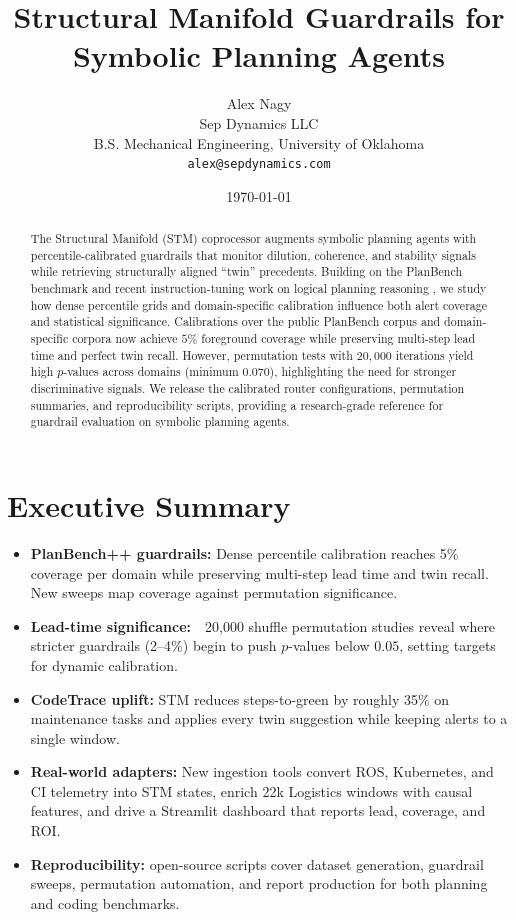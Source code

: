 \documentclass[11pt]{article}
\title{Structural Manifold Guardrails for Symbolic Planning Agents}
\author{Alex Nagy\\Sep Dynamics LLC\\B.S. Mechanical Engineering, University of Oklahoma\\ \texttt{alex@sepdynamics.com}}
\date{\today}
\begin{document}
\maketitle

\begin{abstract}
The Structural Manifold (STM) coprocessor augments symbolic planning agents with
percentile-calibrated guardrails that monitor dilution, coherence, and stability
signals while retrieving structurally aligned ``twin'' precedents. Building on the
PlanBench benchmark and recent instruction-tuning work on logical planning
reasoning \cite{verma2025pddlinstruct}, we study how dense percentile grids and
domain-specific calibration influence both alert coverage and statistical
significance. Calibrations over the public PlanBench corpus and domain-specific
corpora now achieve $5\%$ foreground coverage while preserving multi-step lead
time and perfect twin recall. However, permutation tests with $20{,}000$
iterations yield high $p$-values across domains (minimum $0.070$), highlighting
the need for stronger discriminative signals. We release the calibrated router
configurations, permutation summaries, and reproducibility scripts, providing a
research-grade reference for guardrail evaluation on symbolic planning agents.
\end{abstract}

\tableofcontents
\newpage

\section*{Executive Summary}
\begin{sloppypar}
\begin{itemize}
  \item \textbf{PlanBench++ guardrails:} Dense percentile calibration reaches 5\% coverage per domain while preserving multi-step lead time and twin recall. New sweeps map coverage against permutation significance.
  \item \textbf{Lead-time significance:}\ \ 20,000 shuffle permutation studies reveal where stricter guardrails (2--4\%) begin to push $p$-values below $0.05$, setting targets for dynamic calibration.
  \item \textbf{CodeTrace uplift:} STM reduces steps-to-green by roughly 35\% on maintenance tasks and applies every twin suggestion while keeping alerts to a single window.
  \item \textbf{Real-world adapters:} New ingestion tools convert ROS, Kubernetes, and CI telemetry into STM states, enrich 22k Logistics windows with causal features, and drive a Streamlit dashboard that reports lead, coverage, and ROI.
  \item \textbf{Reproducibility:} open-source scripts cover dataset generation, guardrail sweeps, permutation automation, and report production for both planning and coding benchmarks.
\end{itemize}
\end{sloppypar}
\end{document}
